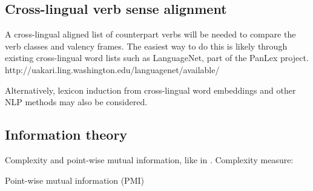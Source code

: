 \subsection{Cross-lingual verb sense alignment}\label{subsec:verblist}

A cross-lingual aligned list of counterpart verbs will be needed to compare the verb classes and valency frames. The easiest way to do this is likely through existing cross-lingual word lists such as LanguageNet, part of the PanLex project. http://uakari.ling.washington.edu/languagenet/available/

Alternatively, lexicon induction from cross-lingual word embeddings and other NLP methods may also be considered.

\subsection{Information theory}\label{subsec:infotheory}

Complexity and point-wise mutual information, like in \citet{say2014}.
Complexity measure:

Point-wise mutual information (PMI)
